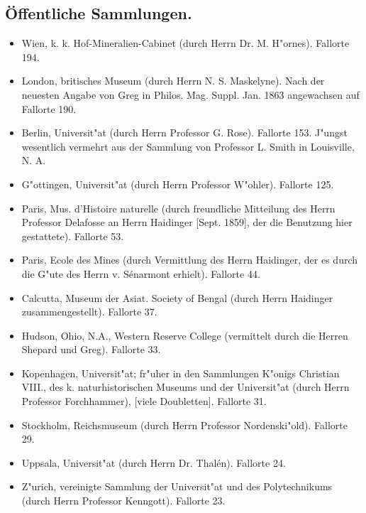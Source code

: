 \documentclass[a4paper, 11pt, oneside]{article}
\begin{document}
\subsection*{Öffentliche Sammlungen.}
\begin{itemize}
    \item Wien, k. k. Hof-Mineralien-Cabinet (durch Herrn Dr. M. H"ornes). Fallorte 194.

    \item London, britisches Museum (durch Herrn N. S. Maskelyne). Nach der neuesten Angabe von Greg in Philos. Mag. Suppl. Jan. 1863 angewachsen auf Fallorte 190.

    \item Berlin, Universit"at (durch Herrn Professor G. Rose). Fallorte 153. J"ungst wesentlich vermehrt aus der Sammlung von Professor L. Smith in Louisville, N. A.

    \item G"ottingen, Universit"at (durch Herrn Professor W"ohler). Fallorte 125.

    \item Paris, Mus. d'Histoire naturelle (durch freundliche Mitteilung des Herrn Professor Delafosse an Herrn Haidinger [Sept. 1859], der die Benutzung hier gestattete). Fallorte 53.

    \item Paris, Ecole des Mines (durch Vermittlung des Herrn Haidinger, der es durch die G"ute des Herrn v. Sénarmont erhielt). Fallorte 44.

    \item Calcutta, Museum der Asiat. Society of Bengal (durch Herrn Haidinger zusammengestellt). Fallorte 37.

    \item Hudson, Ohio, N.A., Western Reserve College (vermittelt durch die Herren Shepard und Greg). Fallorte 33.

    \item Kopenhagen, Universit"at; fr"uher in den Sammlungen K"onigs Christian VIII., des k. naturhistorischen Museums und der Universit"at (durch Herrn Professor Forchhammer), [viele Doubletten]. Fallorte 31.

    \item Stockholm, Reichsmuseum (durch Herrn Professor Nordenski"old). Fallorte 29.

    \item Uppsala, Universit"at (durch Herrn Dr. Thalén). Fallorte 24.

    \item Z"urich, vereinigte Sammlung der Universit"at und des Polytechnikums (durch Herrn Professor Kenngott). Fallorte 23.


\end{itemize}
\end{document}
